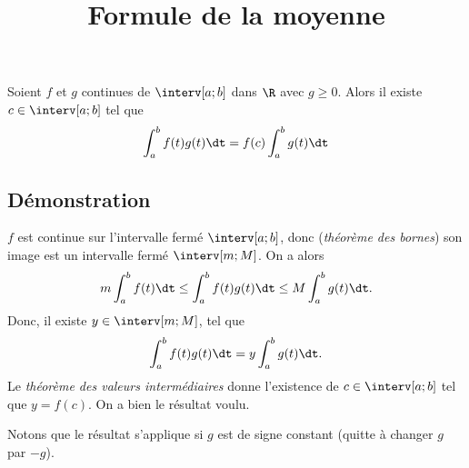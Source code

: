 \documentclass[fontsize=12pt,twoside=false,parskip=half, french]{scrartcl}
\title{Formule de la moyenne}
\date{}
\author{}
\begin{document}
\maketitle
   \begin{Theoreme}
      Soient $f$ et $g$ continues de $\interv[a; b]$ dans $\R$ avec $g \geq 0$. Alors il existe $c \in \interv[a; b]$
      tel que
      \[
         \int_a^b f(t)g(t) \dt = f(c) \int_a^b g(t) \dt
      \]
   \end{Theoreme}
   \subsection{Démonstration}
      $f$ est continue sur l’intervalle fermé $\interv[a; b]$, donc (\emph{théorème des bornes}) son image est un 
      intervalle fermé $\interv[m; M]$. On a alors
      \[
         m\int_a^b f(t)\dt \leq \int_a^b f(t)g(t) \dt \leq M\int_a^b g(t) \dt.
      \]
      Donc, il existe $y \in \interv[m; M]$, tel que
      \[
         \int_a^b f(t)g(t) \dt = y\int_a^b g(t) \dt.
      \]
      Le \emph{théorème des valeurs intermédiaires} donne l’existence de $c \in \interv[a; b]$ tel que $y = f(c)$.
      On a bien le résultat voulu.
      
      Notons que le résultat s’applique si $g$ est de signe constant (quitte à changer $g$ par $-g$).
\end{document}
